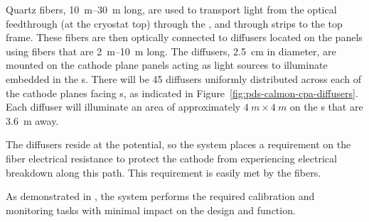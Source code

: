 Quartz fibers, \SIrange{10}{30}{m} long, are used to transport light from the optical feedthrough (at the cryostat top) through the  , and through  strips to the  top frame. 
These fibers are then optically connected to diffusers located on the  panels using fibers that are \SIrange{2}{10}{m} long. 
The diffusers, \SI{2.5}{cm} in diameter, are mounted on the cathode plane panels acting as light sources to illuminate  embedded in the s. There will be \num{45} diffusers uniformly distributed across each of the  cathode planes facing s, as indicated in 
Figure~\ref{fig:pds-calmon-cpa-diffusers}. Each diffuser will illuminate an area of approximately $\SI{4}{m}\times\SI{4}{m}$ on the s that are \SI{3.6}{m} away. 

The diffusers reside at the  potential, so the  system places a requirement on the fiber electrical resistance to protect the cathode from experiencing electrical breakdown along this path. This requirement is easily met by the fibers. 

As demonstrated in , the system performs the required calibration and monitoring tasks with minimal impact on the  design and function. 
